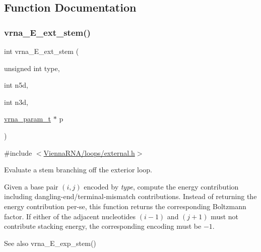 \subsection{Function Documentation}
\mbox{\label{group__eval__loops__ext_gaa0c313c90da11aa741dcd62746d85337}} 
\subsubsection{\texorpdfstring{vrna\_E\_ext\_stem()}{vrna\_E\_ext\_stem()}}
{\footnotesize\ttfamily int vrna\+\_\+\+E\+\_\+ext\+\_\+stem (\begin{DoxyParamCaption}\item[{unsigned int}]{type,  }\item[{int}]{n5d,  }\item[{int}]{n3d,  }\item[{\mbox{\hyperlink{group__energy__parameters_ga8a69ca7d787e4fd6079914f5343a1f35}{vrna\+\_\+param\+\_\+t}} $\ast$}]{p }\end{DoxyParamCaption})}



{\ttfamily \#include $<$\mbox{\hyperlink{external_8h}{Vienna\+R\+N\+A/loops/external.\+h}}$>$}



Evaluate a stem branching off the exterior loop. 

Given a base pair $(i,j)$ encoded by {\itshape type}, compute the energy contribution including dangling-\/end/terminal-\/mismatch contributions. Instead of returning the energy contribution per-\/se, this function returns the corresponding Boltzmann factor. If either of the adjacent nucleotides $(i - 1)$ and $(j+1)$ must not contribute stacking energy, the corresponding encoding must be $-1$.

\begin{DoxySeeAlso}{See also}
vrna\+\_\+\+E\+\_\+exp\+\_\+stem()
\end{DoxySeeAlso}

